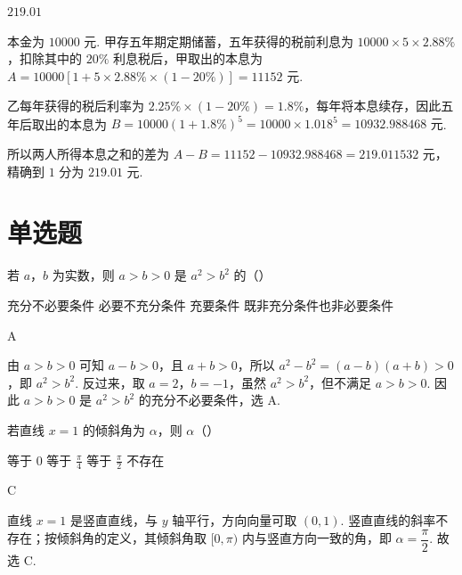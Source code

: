 \begin{answer}
\(219.01\)
\end{answer}

\begin{solution}
本金为 \(10000\text{ 元}\). 甲存五年期定期储蓄，五年获得的税前利息为 \(10000\times5\times2.88\%\)，扣除其中的 \(20\%\) 利息税后，甲取出的本息为
\(A=10000\left[1+5\times2.88\%\times\left(1-20\%\right)\right]=11152\text{ 元}\).

乙每年获得的税后利率为 \(2.25\%\times(1-20\%)=1.8\%\)，每年将本息续存，因此五年后取出的本息为
\(B=10000(1+1.8\%)^5=10000\times1.018^5=10932.988468\text{ 元}\).

所以两人所得本息之和的差为
\(A-B=11152-10932.988468=219.011532\text{ 元}\)，精确到 \(1\) 分为 \(219.01\text{ 元}\).
\end{solution}

\section{单选题}

\begin{problem}
若 \(a\)，\(b\) 为实数，则 \(a>b>0\) 是 \(a^{2}>b^{2}\) 的（\quad）

\choices
    {充分不必要条件}
    {必要不充分条件}
    {充要条件}
    {既非充分条件也非必要条件}
\end{problem}

\begin{answer}
A
\end{answer}

\begin{solution}
由 \(a>b>0\) 可知 \(a-b>0\)，且 \(a+b>0\)，所以 \(a^{2}-b^{2}=(a-b)(a+b)>0\)，即 \(a^{2}>b^{2}\). 反过来，取 \(a=2\)，\(b=-1\)，虽然 \(a^{2}>b^{2}\)，但不满足 \(a>b>0\). 因此 \(a>b>0\) 是 \(a^{2}>b^{2}\) 的充分不必要条件，选 A.
\end{solution}

\begin{problem}
若直线 \(x=1\) 的倾斜角为 \(\alpha\)，则 \(\alpha\)（\quad）

\choices
    {等于 \(0\)}
    {等于 \(\frac{\pi}{4}\)}
    {等于 \(\frac{\pi}{2}\)}
    {不存在}

\end{problem}

\begin{answer}
C
\end{answer}

\begin{solution}
直线 \(x=1\) 是竖直直线，与 \(y\) 轴平行，方向向量可取 \((0,1)\). 竖直直线的斜率不存在；按倾斜角的定义，其倾斜角取 \([0,\pi)\) 内与竖直方向一致的角，即 \(\alpha=\dfrac{\pi}{2}\).
故选 C.
\end{solution}

